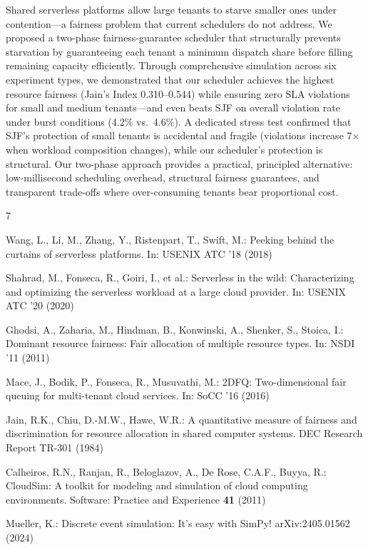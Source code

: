 \documentclass[runningheads]{llncs}
\begin{document}
Shared serverless platforms allow large tenants to starve smaller ones under contention---a fairness problem that current schedulers do not address. We proposed a two-phase fairness-guarantee scheduler that structurally prevents starvation by guaranteeing each tenant a minimum dispatch share before filling remaining capacity efficiently. Through comprehensive simulation across six experiment types, we demonstrated that our scheduler achieves the highest resource fairness (Jain's Index 0.310--0.544) while ensuring zero SLA violations for small and medium tenants---and even beats SJF on overall violation rate under burst conditions (4.2\% vs.\ 4.6\%). A dedicated stress test confirmed that SJF's protection of small tenants is accidental and fragile (violations increase 7$\times$ when workload composition changes), while our scheduler's protection is structural. Our two-phase approach provides a practical, principled alternative: low-millisecond scheduling overhead, structural fairness guarantees, and transparent trade-offs where over-consuming tenants bear proportional cost.

\begin{thebibliography}{7}

Wang, L., Li, M., Zhang, Y., Ristenpart, T., Swift, M.: Peeking behind the curtains of serverless platforms. In: USENIX ATC '18 (2018)

Shahrad, M., Fonseca, R., Goiri, I., et al.: Serverless in the wild: Characterizing and optimizing the serverless workload at a large cloud provider. In: USENIX ATC '20 (2020)

Ghodsi, A., Zaharia, M., Hindman, B., Konwinski, A., Shenker, S., Stoica, I.: Dominant resource fairness: Fair allocation of multiple resource types. In: NSDI '11 (2011)

Mace, J., Bodik, P., Fonseca, R., Musuvathi, M.: 2DFQ: Two-dimensional fair queuing for multi-tenant cloud services. In: SoCC '16 (2016)

Jain, R.K., Chiu, D.-M.W., Hawe, W.R.: A quantitative measure of fairness and discrimination for resource allocation in shared computer systems. DEC Research Report TR-301 (1984)

Calheiros, R.N., Ranjan, R., Beloglazov, A., De Rose, C.A.F., Buyya, R.: CloudSim: A toolkit for modeling and simulation of cloud computing environments. Software: Practice and Experience \textbf{41} (2011)

Mueller, K.: Discrete event simulation: It's easy with SimPy! arXiv:2405.01562 (2024)

\end{thebibliography}
\end{document}
